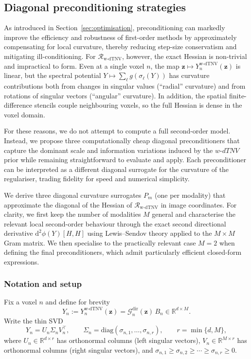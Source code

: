 \subsection{Diagonal preconditioning strategies}
\label{subsec:preconditioning}

As introduced in Section~\ref{sec:optimisation}, preconditioning can markedly improve the efficiency and robustness of first-order methods by approximately compensating for local curvature, thereby reducing step-size conservatism and mitigating ill-conditioning. For $\mathcal{R}_{\mathrm{w\text{-}dTNV}}$, however, the exact Hessian is non-trivial and impractical to form. Even at a single voxel $n$, the map $\bm{z}\mapsto Y^{\mathrm{w\text{-}dTNV}}_n(\bm{z})$ is linear, but the spectral potential $Y\mapsto \sum_{\ell} g(\sigma_\ell(Y))$ has curvature contributions both from changes in singular values (``radial'' curvature) and from rotations of singular vectors (``angular'' curvature). In addition, the spatial finite-difference stencils couple neighbouring voxels, so the full Hessian is dense in the voxel domain.

For these reasons, we do not attempt to compute a full second-order model. Instead, we propose three computationally cheap diagonal preconditioners that capture the dominant scale and information variations induced by the $w\text{-}dTNV$ prior while remaining straightforward to evaluate and apply. Each preconditioner can be interpreted as a different diagonal surrogate for the curvature of the regulariser, trading fidelity for speed and numerical simplicity.

We derive three diagonal curvature surrogates $P_m$ (one per modality) that approximate the diagonal of the Hessian of $\mathcal{R}_{\mathrm{w\text{-}dTNV}}$ in image coordinates. For clarity, we first keep the number of modalities $M$ general and characterise the relevant local second-order behaviour through the exact second directional derivative $\mathrm{d}^2\phi(Y)[H,H]$ using Lewis--Sendov theory applied to the $M\times M$ Gram matrix. We then specialise to the practically relevant case $M=2$ when defining the final preconditioners, which admit particularly efficient closed-form expressions.

\subsubsection{Notation and setup}

Fix a voxel $n$ and define for brevity
\begin{equation}
Y_n := Y^{\mathrm{w\text{-}dTNV}}_n(\bm{z}) = \mathcal{G}^{\mathrm{dir}}_n(\bm{z})\,B_n \in \mathbb{R}^{d\times M}.
\end{equation}
Write the thin SVD
\begin{equation}
Y_n = U_n \Sigma_n V_n^\top, \qquad
\Sigma_n = \mathrm{diag}(\sigma_{n,1},\ldots,\sigma_{n,r}), \qquad r=\min\{d,M\},
\end{equation}
where $U_n \in \mathbb{R}^{d \times r}$ has orthonormal columns (left singular vectors), $V_n \in \mathbb{R}^{M \times r}$ has orthonormal columns (right singular vectors), and $\sigma_{n,1} \geq \sigma_{n,2} \geq \cdots \geq \sigma_{n,r} \geq 0$.

